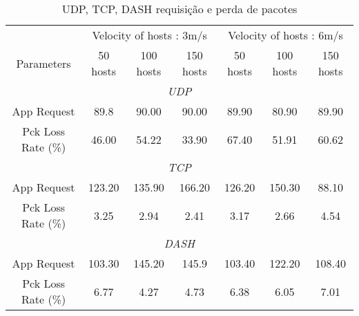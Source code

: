 \documentclass[12pt]{article}
\begin{document}
\begin{table}[h!]
  \centering
  \caption{UDP, TCP, DASH requisição e perda de pacotes}
  \begin{tabular}{c|ccc|ccc}
    \hline
    \multicolumn{1}{c}{} & \multicolumn{3}{c}{Velocity of hosts : 3m/s} & \multicolumn{3}{c}{Velocity of hosts : 6m/s} 			\\ 
    Parameters             & 50 hosts      & 100 hosts     & 150 hosts     &   50 hosts      & 100 hosts     & 150 hosts     		\\ 
    \hline
    \hline
    \multicolumn{7}{c}{\textit{UDP}} \\
    \hline
    \hline
    App Request            & 89.8   & 90.00   & 90.00 & 89.90  & 80.90    &  89.90  \\
    Pck Loss Rate (\%)     & 46.00  & 54.22   & 33.90 & 67.40  & 51.91    &  60.62   \\
    \hline
    \hline
    \multicolumn{7}{c}{\textit{TCP}} \\
    \hline
    \hline
    App Request            & 123.20    & 135.90   & 166.20     & 126.20  & 150.30    &  88.10  \\
    Pck Loss Rate (\%)     & 3.25      & 2.94     & 2.41       & 3.17    & 2.66      &  4.54  	\\
    \hline
    \hline
    \multicolumn{7}{c}{\textit{DASH}} \\
    \hline
    \hline
    App Request            & 103.30    & 145.20   & 145.9     & 103.40  & 122.20    &  108.40  \\
    Pck Loss Rate (\%)     & 6.77      & 4.27     & 4.73      & 6.38    & 6.05      &  7.01   \\
    \hline
  \end{tabular}
  \label{tab:tableperda}
\end{table}
\FloatBarrier
	
\end{document}
